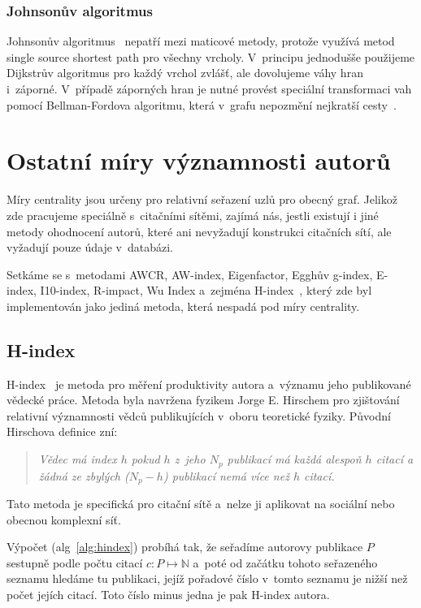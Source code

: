 \documentclass{bakalarka}
\begin{document}
\subsubsection{Johnsonův algoritmus}
Johnsonův algoritmus~\citep{johnson1977} nepatří mezi maticové metody, protože
využívá metod single source shortest path pro všechny vrcholy. V~principu
jednodušše použijeme Dijkstrův algoritmus pro každý vrchol zvlášť, ale
dovolujeme váhy hran i~záporné. V~případě záporných hran je nutné provést
speciální transformaci vah pomocí Bellman-Fordova algoritmu, která v~grafu
nepozmění nejkratší cesty~\citep{CLRS}.


\section{Ostatní míry významnosti autorů}
Míry centrality jsou určeny pro relativní seřazení uzlů pro obecný graf.
Jelikož zde pracujeme speciálně s~citačními sítěmi, zajímá nás, jestli existují
i jiné metody ohodnocení autorů, které ani nevyžadují konstrukci citačních
sítí, ale vyžadují pouze údaje v~databázi.

Setkáme se s~metodami AWCR, AW-index, Eigenfactor, Egghův g-index, E-index,
I10-index, R-impact, Wu Index a~zejména H-index~\citep{hlwikiaim}, který zde
byl implementován jako jediná metoda, která nespadá pod míry centrality.

\subsection{H-index}
H-index~\citep{hirsch2005} je metoda pro měření produktivity autora a~významu
jeho publikované vědecké práce. Metoda byla navržena fyzikem Jorge E. Hirschem
pro zjištování relativní významnosti vědců publikujících v~oboru teoretické
fyziky. Původní Hirschova definice zní:

\begin{quote}\textit{
Vědec má index $h$ pokud $h$ z~jeho $N_p$ publikací má každá alespoň $h$ citací
a žádná ze zbylých ($N_p - h$) publikací nemá více než $h$ citací.
}
\end{quote}

Tato metoda je specifická pro citační sítě a~nelze ji aplikovat na sociální
nebo obecnou komplexní síť.

Výpočet (alg~\ref{alg:hindex}) probíhá tak, že seřadíme autorovy publikace $P$
sestupně podle počtu citací $c: P \mapsto \mathbb{N}$ a~poté od začátku tohoto
seřazeného seznamu hledáme tu publikaci, jejíž pořadové číslo v~tomto seznamu
je nižší než počet jejích citací. Toto číslo minus jedna je pak H-index autora.
\end{document}
